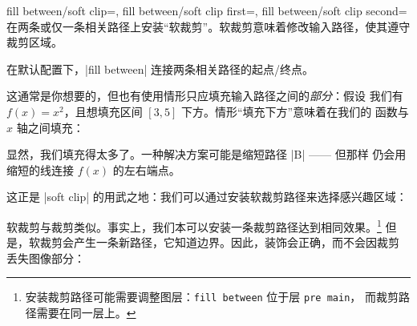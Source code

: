 \begin{tikzkeylist}{%
    fill between/soft clip=,
    fill between/soft clip first=,
    fill between/soft clip second=%
}
    在两条或仅一条相关路径上安装“软裁剪”。软裁剪意味着修改输入路径，使其遵守
    裁剪区域。

    在默认配置下，|fill between| 连接两条相关路径的起点/终点。

    这通常是你想要的，但也有使用情形只应填充输入路径之间的\emph{部分}：假设
    我们有 $f(x)=x^2$，且想填充区间 $[3,5]$ 下方。情形“填充下方”意味着在我们的
    函数与 $x$ 轴之间填充：
\begin{codeexample}[]
\end{codeexample}
    \noindent 显然，我们填充得太多了。一种解决方案可能是缩短路径 |B| —— 但那样
    仍会用缩短的线连接 $f(x)$ 的左右端点。

    这正是 |soft clip| 的用武之地：我们可以通过安装软裁剪路径来选择感兴趣区域：
\begin{codeexample}[]
\end{codeexample}

    软裁剪与裁剪类似。事实上，我们本可以安装一条裁剪路径达到相同效果。\footnote{
    安装裁剪路径可能需要调整图层：\texttt{fill between} 位于层 \texttt{pre main}，
    而裁剪路径需要在同一层上。}
    但是，软裁剪会产生一条新路径，它知道边界。因此，装饰会正确，而不会因裁剪
    丢失图像部分：
\begin{codeexample}[]
\end{codeexample}
\end{tikzkeylist}
